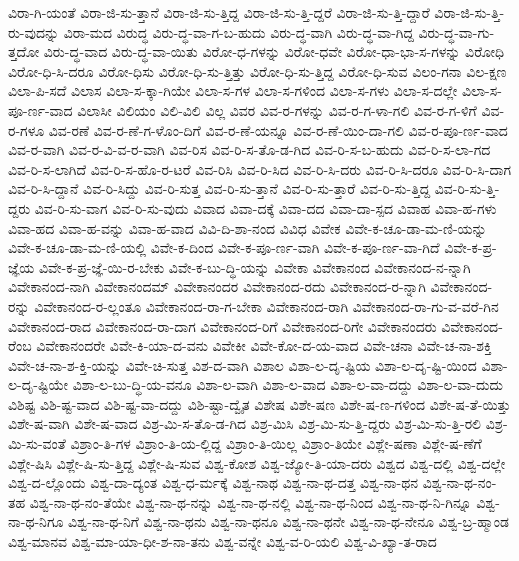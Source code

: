 {ವಿರಾ-ಗಿ-ಯಂತೆ
ವಿರಾ-ಜಿ-ಸು-ತ್ತಾನೆ
ವಿರಾ-ಜಿ-ಸು-ತ್ತಿದ್ದ
ವಿರಾ-ಜಿ-ಸು-ತ್ತಿ-ದ್ದರೆ
ವಿರಾ-ಜಿ-ಸು-ತ್ತಿ-ದ್ದಾರೆ
ವಿರಾ-ಜಿ-ಸು-ತ್ತಿ-ರು-ವುದನ್ನು
ವಿರಾ-ಮದ
ವಿರುದ್ಧ
ವಿರು-ದ್ಧ-ವಾ-ಗ-ಬ-ಹುದು
ವಿರು-ದ್ಧ-ವಾಗಿ
ವಿರು-ದ್ಧ-ವಾ-ಗಿದ್ದ
ವಿರು-ದ್ಧ-ವಾ-ಗು-ತ್ತದೋ
ವಿರು-ದ್ಧ-ವಾದ
ವಿರು-ದ್ಧ-ವಾ-ಯಿತು
ವಿರೋ-ಧ-ಗಳನ್ನು
ವಿರೋ-ಧವೇ
ವಿರೋ-ಧಾ-ಭಾ-ಸ-ಗಳನ್ನು
ವಿರೋಧಿ
ವಿರೋ-ಧಿ-ಸಿ-ದರೂ
ವಿರೋ-ಧಿಸು
ವಿರೋ-ಧಿ-ಸು-ತ್ತಿತ್ತು
ವಿರೋ-ಧಿ-ಸು-ತ್ತಿದ್ದ
ವಿರೋ-ಧಿ-ಸುವ
ವಿಲಂ-ಗನಾ
ವಿಲ-ಕ್ಷಣ
ವಿಲಾ-ಪಿ-ಸದೆ
ವಿಲಾಸ
ವಿಲಾ-ಸ-ಕ್ಕಾ-ಗಿಯೇ
ವಿಲಾ-ಸ-ಗಳ
ವಿಲಾ-ಸ-ಗಳಿಂದ
ವಿಲಾ-ಸ-ಗಳು
ವಿಲಾ-ಸ-ದಲ್ಲೇ
ವಿಲಾ-ಸ-ಪೂ-ರ್ಣ-ವಾದ
ವಿಲಾಸೀ
ವಿಲಿಯಂ
ವಿಲಿ-ವಿಲಿ
ವಿಲ್ಲ
ವಿವರ
ವಿವ-ರ-ಗಳನ್ನು
ವಿವ-ರ-ಗ-ಳಾ-ಗಲಿ
ವಿವ-ರ-ಗ-ಳಿಗೆ
ವಿವ-ರ-ಗಳೂ
ವಿವ-ರಣೆ
ವಿವ-ರ-ಣೆ-ಗ-ಳೊಂ-ದಿಗೆ
ವಿವ-ರ-ಣೆ-ಯನ್ನೂ
ವಿವ-ರ-ಣೆ-ಯಿಂ-ದಾ-ಗಲಿ
ವಿವ-ರ-ಪೂ-ರ್ಣ-ವಾದ
ವಿವ-ರ-ವಾಗಿ
ವಿವ-ರ-ವಿ-ವ-ರ-ವಾಗಿ
ವಿವ-ರಿಸ
ವಿವ-ರಿ-ಸ-ತೊ-ಡ-ಗಿದ
ವಿವ-ರಿ-ಸ-ಬ-ಹುದು
ವಿವ-ರಿ-ಸ-ಲಾ-ಗದ
ವಿವ-ರಿ-ಸ-ಲಾಗಿದೆ
ವಿವ-ರಿ-ಸ-ಹೊ-ರ-ಟರೆ
ವಿವ-ರಿಸಿ
ವಿವ-ರಿ-ಸಿದ
ವಿವ-ರಿ-ಸಿ-ದರು
ವಿವ-ರಿ-ಸಿ-ದರೂ
ವಿವ-ರಿ-ಸಿ-ದಾಗ
ವಿವ-ರಿ-ಸಿ-ದ್ದಾನೆ
ವಿವ-ರಿ-ಸಿದ್ದು
ವಿವ-ರಿ-ಸುತ್ತ
ವಿವ-ರಿ-ಸು-ತ್ತಾನೆ
ವಿವ-ರಿ-ಸು-ತ್ತಾರೆ
ವಿವ-ರಿ-ಸು-ತ್ತಿದ್ದ
ವಿವ-ರಿ-ಸು-ತ್ತಿ-ದ್ದರು
ವಿವ-ರಿ-ಸು-ವಾಗ
ವಿವ-ರಿ-ಸು-ವುದು
ವಿವಾದ
ವಿವಾ-ದಕ್ಕೆ
ವಿವಾ-ದದ
ವಿವಾ-ದಾ-ಸ್ಪದ
ವಿವಾಹ
ವಿವಾ-ಹ-ಗಳು
ವಿವಾ-ಹದ
ವಿವಾ-ಹ-ವನ್ನು
ವಿವಾ-ಹ-ವಾದ
ವಿವಿ-ದಿ-ಶಾ-ನಂದ
ವಿವಿಧ
ವಿವೇಕ
ವಿವೇ-ಕ-ಚೂ-ಡಾ-ಮ-ಣಿ-ಯನ್ನು
ವಿವೇ-ಕ-ಚೂ-ಡಾ-ಮ-ಣಿ-ಯಲ್ಲಿ
ವಿವೇ-ಕ-ದಿಂದ
ವಿವೇ-ಕ-ಪೂ-ರ್ಣ-ವಾಗಿ
ವಿವೇ-ಕ-ಪೂ-ರ್ಣ-ವಾ-ಗಿದೆ
ವಿವೇ-ಕ-ಪ್ರ-ಜ್ಞೆಯ
ವಿವೇ-ಕ-ಪ್ರ-ಜ್ಞೆ-ಯಿ-ರ-ಬೇಕು
ವಿವೇ-ಕ-ಬು-ದ್ಧಿ-ಯನ್ನು
ವಿವೇಕಾ
ವಿವೇಕಾನಂದ
ವಿವೇಕಾನಂದ-ನ-ನ್ನಾಗಿ
ವಿವೇಕಾನಂದ-ನಾಗಿ
ವಿವೇಕಾನಂದಮ್
ವಿವೇಕಾನಂದರ
ವಿವೇಕಾನಂದ-ರದು
ವಿವೇಕಾನಂದ-ರ-ನ್ನಾಗಿ
ವಿವೇಕಾನಂದ-ರನ್ನು
ವಿವೇಕಾನಂದ-ರ-ಲ್ಲಂತೂ
ವಿವೇಕಾನಂದ-ರಾ-ಗ-ಬೇಕಾ
ವಿವೇಕಾನಂದ-ರಾಗಿ
ವಿವೇಕಾನಂದ-ರಾ-ಗು-ವ-ವರೆ-ಗಿನ
ವಿವೇಕಾನಂದ-ರಾದ
ವಿವೇಕಾನಂದ-ರಾ-ದಾಗ
ವಿವೇಕಾನಂದ-ರಿಗೆ
ವಿವೇಕಾನಂದ-ರಿಗೇ
ವಿವೇಕಾನಂದರು
ವಿವೇಕಾನಂದ-ರೆಂಬ
ವಿವೇಕಾನಂದರೇ
ವಿವೇ-ಕಿ-ಯಾ-ದ-ವನು
ವಿವೇಕೀ
ವಿವೇ-ಕೋ-ದ-ಯ-ವಾದ
ವಿವೇ-ಚನಾ
ವಿವೇ-ಚ-ನಾ-ಶಕ್ತಿ
ವಿವೇ-ಚ-ನಾ-ಶ-ಕ್ತಿ-ಯನ್ನು
ವಿವೇ-ಚಿ-ಸುತ್ತ
ವಿಶ-ದ-ವಾಗಿ
ವಿಶಾಲ
ವಿಶಾ-ಲ-ದೃ-ಷ್ಟಿಯ
ವಿಶಾ-ಲ-ದೃ-ಷ್ಟಿ-ಯಿಂದ
ವಿಶಾ-ಲ-ದೃ-ಷ್ಟಿಯೇ
ವಿಶಾ-ಲ-ಬು-ದ್ಧಿ-ಯ-ವನೂ
ವಿಶಾ-ಲ-ವಾಗಿ
ವಿಶಾ-ಲ-ವಾದ
ವಿಶಾ-ಲ-ವಾ-ದದ್ದು
ವಿಶಾ-ಲ-ವಾ-ದುದು
ವಿಶಿಷ್ಟ
ವಿಶಿ-ಷ್ಟ-ವಾದ
ವಿಶಿ-ಷ್ಟ-ವಾ-ದದ್ದು
ವಿಶಿ-ಷ್ಟಾ-ದ್ವೈತ
ವಿಶೇಷ
ವಿಶೇ-ಷಣ
ವಿಶೇ-ಷ-ಣ-ಗಳಿಂದ
ವಿಶೇ-ಷ-ತೆ-ಯಿತ್ತು
ವಿಶೇ-ಷ-ವಾಗಿ
ವಿಶೇ-ಷ-ವಾದ
ವಿಶ್ರ-ಮಿ-ಸ-ತೊ-ಡ-ಗಿದ
ವಿಶ್ರ-ಮಿಸಿ
ವಿಶ್ರ-ಮಿ-ಸು-ತ್ತಿ-ದ್ದರು
ವಿಶ್ರ-ಮಿ-ಸು-ತ್ತಿ-ರಲಿ
ವಿಶ್ರ-ಮಿ-ಸು-ವಂತೆ
ವಿಶ್ರಾಂ-ತಿ-ಗಳ
ವಿಶ್ರಾಂ-ತಿ-ಯ-ಲ್ಲಿದ್ದ
ವಿಶ್ರಾಂ-ತಿ-ಯಿಲ್ಲ
ವಿಶ್ರಾಂ-ತಿಯೇ
ವಿಶ್ಲೇ-ಷಣಾ
ವಿಶ್ಲೇ-ಷ-ಣೆಗೆ
ವಿಶ್ಲೇ-ಷಿಸಿ
ವಿಶ್ಲೇ-ಷಿ-ಸು-ತ್ತಿದ್ದ
ವಿಶ್ಲೇ-ಷಿ-ಸುವ
ವಿಶ್ವ-ಕೋಶ
ವಿಶ್ವ-ಜ್ಯೋ-ತಿ-ಯಾ-ದರು
ವಿಶ್ವದ
ವಿಶ್ವ-ದಲ್ಲಿ
ವಿಶ್ವ-ದಲ್ಲೇ
ವಿಶ್ವ-ದ-ಲ್ಲೊಂದು
ವಿಶ್ವ-ದಾ-ದ್ಯಂತ
ವಿಶ್ವ-ಧ-ರ್ಮಕ್ಕೆ
ವಿಶ್ವ-ನಾಥ
ವಿಶ್ವ-ನಾ-ಥ-ದತ್ತ
ವಿಶ್ವ-ನಾ-ಥನ
ವಿಶ್ವ-ನಾ-ಥ-ನಂ-ತಹ
ವಿಶ್ವ-ನಾ-ಥ-ನಂ-ತೆಯೇ
ವಿಶ್ವ-ನಾ-ಥ-ನನ್ನು
ವಿಶ್ವ-ನಾ-ಥ-ನಲ್ಲಿ
ವಿಶ್ವ-ನಾ-ಥ-ನಿಂದ
ವಿಶ್ವ-ನಾ-ಥ-ನಿ-ಗಿನ್ನೂ
ವಿಶ್ವ-ನಾ-ಥ-ನಿಗೂ
ವಿಶ್ವ-ನಾ-ಥ-ನಿಗೆ
ವಿಶ್ವ-ನಾ-ಥನು
ವಿಶ್ವ-ನಾ-ಥನೂ
ವಿಶ್ವ-ನಾ-ಥನೇ
ವಿಶ್ವ-ನಾ-ಥ-ನೇನೂ
ವಿಶ್ವ-ಬ್ರ-ಹ್ಮಾಂಡ
ವಿಶ್ವ-ಮಾನವ
ವಿಶ್ವ-ಮಾ-ಯಾ-ಧೀ-ಶ-ನಾ-ತನು
ವಿಶ್ವ-ವನ್ನೇ
ವಿಶ್ವ-ವ-ರಿ-ಯಲಿ
ವಿಶ್ವ-ವಿ-ಖ್ಯಾ-ತ-ರಾದ
}
